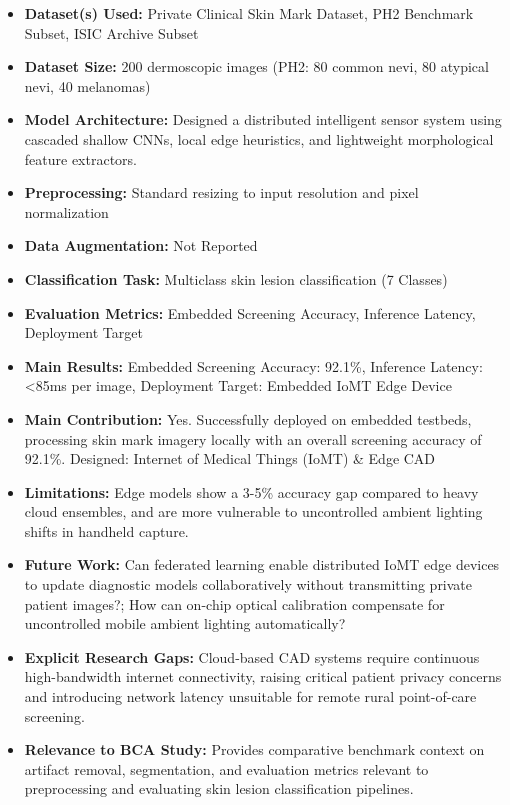 \documentclass[11pt,a4paper]{article}
\begin{document}
\begin{itemize}\small
\item \textbf{Dataset(s) Used:} Private Clinical Skin Mark Dataset, PH2 Benchmark Subset, ISIC Archive Subset
\item \textbf{Dataset Size:} 200 dermoscopic images (PH2: 80 common nevi, 80 atypical nevi, 40 melanomas)
\item \textbf{Model Architecture:} Designed a distributed intelligent sensor system using cascaded shallow CNNs, local edge heuristics, and lightweight morphological feature extractors.
\item \textbf{Preprocessing:} Standard resizing to input resolution and pixel normalization
\item \textbf{Data Augmentation:} Not Reported
\item \textbf{Classification Task:} Multiclass skin lesion classification (7 Classes)
\item \textbf{Evaluation Metrics:} Embedded Screening Accuracy, Inference Latency, Deployment Target
\item \textbf{Main Results:} Embedded Screening Accuracy: 92.1\%, Inference Latency: <85ms per image, Deployment Target: Embedded IoMT Edge Device
\item \textbf{Main Contribution:} Yes. Successfully deployed on embedded testbeds, processing skin mark imagery locally with an overall screening accuracy of 92.1\%. Designed: Internet of Medical Things (IoMT) \& Edge CAD
\item \textbf{Limitations:} Edge models show a 3-5\% accuracy gap compared to heavy cloud ensembles, and are more vulnerable to uncontrolled ambient lighting shifts in handheld capture.
\item \textbf{Future Work:} Can federated learning enable distributed IoMT edge devices to update diagnostic models collaboratively without transmitting private patient images?; How can on-chip optical calibration compensate for uncontrolled mobile ambient lighting automatically?
\item \textbf{Explicit Research Gaps:} Cloud-based CAD systems require continuous high-bandwidth internet connectivity, raising critical patient privacy concerns and introducing network latency unsuitable for remote rural point-of-care screening.
\item \textbf{Relevance to BCA Study:} Provides comparative benchmark context on artifact removal, segmentation, and evaluation metrics relevant to preprocessing and evaluating skin lesion classification pipelines.
\end{itemize}
\end{document}
